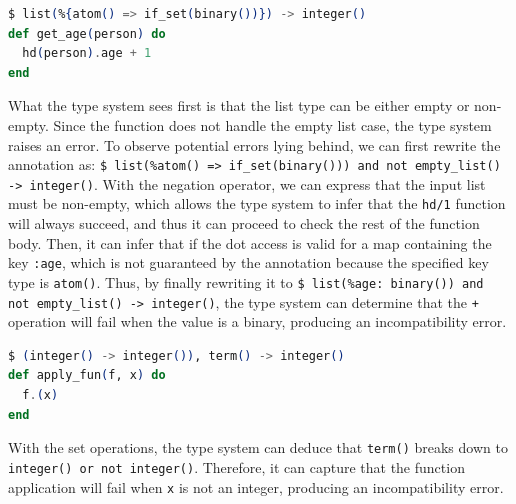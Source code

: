 \begin{lstlisting}[language=Elixir, firstnumber=last]
$ list(%{atom() => if_set(binary())}) -> integer()
def get_age(person) do
  hd(person).age + 1
end
\end{lstlisting}

What the type system sees first is that the list type can be either empty or non-empty.
Since the function does not handle the empty list case, the type system raises an error.
To observe potential errors lying behind, we can first rewrite the annotation as: \texttt{\$ list(\%{atom() => if\_set(binary())}) and not empty\_list() -> integer()}.
With the negation operator, we can express that the input list must be non-empty, which allows the type system to infer that the \texttt{hd/1} function will always succeed, and thus it can proceed to check the rest of the function body.
Then, it can infer that if the dot access is valid for a map containing the key \texttt{:age}, which is not guaranteed by the annotation because the specified key type is \texttt{atom()}.
Thus, by finally rewriting it to \texttt{\$ list(\%{age: binary()}) and not empty\_list() -> integer()}, the type system can determine that the \texttt{+} operation will fail when the value is a binary, producing an incompatibility error.

\begin{lstlisting}[language=Elixir, firstnumber=last]
$ (integer() -> integer()), term() -> integer()
def apply_fun(f, x) do
  f.(x)
end
\end{lstlisting}

With the set operations, the type system can deduce that \texttt{term()} breaks down to \texttt{integer() or not integer()}.
Therefore, it can capture that the function application will fail when \texttt{x} is not an integer, producing an incompatibility error.
